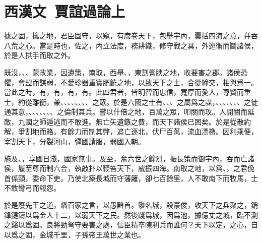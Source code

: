 \section[賈誼過秦論上\quad{\small 西漢文}]{{\normalsize 西漢文\ 賈誼}\quad 過論上}
據之固，擁之地，君臣固守，以窺，有席卷天下，包舉宇內，囊括四海之意，幷吞八荒之心。當是時也，佐之，內立法度，務耕織，修守戰之具，外連衡而鬬諸侯，於是人拱手而取之外。

既沒，、、蒙故業，因遺策，南取，西舉、，東割膏腴之地，收要害之郡。諸侯恐懼，會盟而謀弱，不愛珍器重寶肥饒之地，以致天下之士，合從締交，相與爲一。當此之時，有，有，有，有。此四君者，皆明智而忠信，寬厚而愛人，尊賢而重士，約從離衡，兼、、、、、、、、之眾。於是六國之士有、、、之屬爲之謀，、、、、、、、之徒通其意，、、、、、、、之倫制其兵。嘗以什倍之地，百萬之眾，叩關而攻。人開關而延敵，九國之師遁逃而不敢進。無亡矢遺鏃之費，而天下諸侯已困矣。於是從散約解，爭割地而賂。有餘力而制其弊，追亡逐北，伏尸百萬，流血漂櫓。因利乘便，宰割天下，分裂河山，彊國請服，弱國入朝。

施及、，享國日淺，國家無事。及至，奮六世之餘烈，振長策而御宇內，吞而亡諸侯，履至尊而制六合，執敲扑以鞭笞天下，威振四海。南取之地，以爲、，之君俛首係頸，委命下吏。乃使北築長城而守藩籬，卻七百餘里，人不敢南下而牧馬，士不敢彎弓而報怨。

於是廢先王之道，燔百家之言，以愚黔首。隳名城，殺豪俊，收天下之兵聚之，銷鋒鍉鑄以爲金人十二，以弱天下之民。然後踐爲城，因爲池，據億丈之城，臨不測之谿以爲固。良將勁弩守要害之處，信臣精卒陳利兵而誰何？天下以定，之心，自以爲之固，金城千里，子孫帝王萬世之業也。

